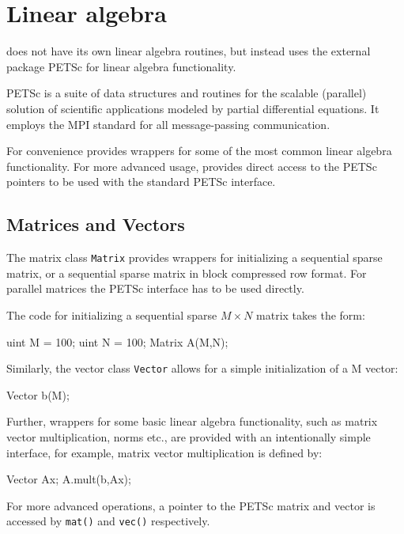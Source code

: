\chapter{Linear algebra}


\dolfin{} does not have its own linear algebra routines, 
but instead uses the external package PETSc \cite{www:petsc} 
for linear algebra functionality.    

PETSc is a suite of data structures and routines for the scalable 
(parallel) solution of scientific applications modeled by partial 
differential equations. 
It employs the MPI standard for all message-passing communication.  

For convenience \dolfin{} provides wrappers for some of the most 
common linear algebra functionality. For more advanced usage, 
\dolfin{} provides direct access to the PETSc pointers 
to be used with the standard PETSc interface. 

\section{Matrices and Vectors}

The matrix class \texttt{Matrix} provides wrappers for initializing 
a sequential sparse matrix, or a sequential sparse matrix in 
block compressed row format. For parallel matrices the PETSc 
interface has to be used directly. 

The code for initializing a sequential sparse $M\times N$ matrix 
takes the form: 
%
\begin{code}
uint M = 100; 
uint N = 100; 
Matrix A(M,N);
\end{code}

Similarly, the vector class \texttt{Vector} allows for a simple 
initialization of a M vector:  
%
\begin{code}
Vector b(M);
\end{code}

Further, wrappers for some basic linear algebra functionality, such as matrix vector 
multiplication, norms etc., are provided with an intentionally simple interface, 
for example, matrix vector multiplication is defined by: 
%
\begin{code}
Vector Ax;
A.mult(b,Ax);
\end{code} 

For more advanced operations, a pointer to the PETSc matrix and vector is 
accessed by \texttt{mat()} and \texttt{vec()} respectively. 

